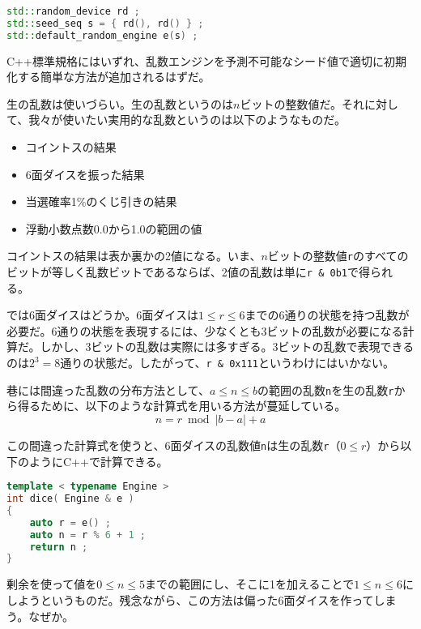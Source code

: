 \begin{lstlisting}[language={C++}]
std::random_device rd ;
std::seed_seq s = { rd(), rd() } ;
std::default_random_engine e(s) ;
\end{lstlisting}

C++標準規格にはいずれ、乱数エンジンを予測不可能なシード値で適切に初期化する簡単な方法が追加されるはずだ。

\clearpage
{}

生の乱数は使いづらい。生の乱数というのは\(n\)ビットの整数値だ。それに対して、我々が使いたい実用的な乱数というのは以下のようなものだ。

\begin{itemize}
\item
  コイントスの結果
\item
  6面ダイスを振った結果
\item
  当選確率1\%のくじ引きの結果
\item
  浮動小数点数0.0から1.0の範囲の値
\end{itemize}

コイントスの結果は表か裏かの2値になる。いま、\(n\)ビットの整数値\texttt{r}のすべてのビットが等しく乱数ビットであるならば、2値の乱数は単に\texttt{r \& 0b1}で得られる。

では6面ダイスはどうか。6面ダイスは\(1 \leq r \leq 6\)までの6通りの状態を持つ乱数が必要だ。6通りの状態を表現するには、少なくとも3ビットの乱数が必要になる計算だ。しかし、3ビットの乱数は実際には多すぎる。3ビットの乱数で表現できるのは\(2^3=8\)通りの状態だ。したがって、\texttt{r \& 0x111}というわけにはいかない。

巷には間違った乱数の分布方法として、\(a \leq n \leq b\)の範囲の乱数\texttt{n}を生の乱数\texttt{r}から得るために、以下のような計算式を用いる方法が蔓延している。
\[
n = r \bmod |b-a| + a
\]

この間違った計算式を使うと、6面ダイスの乱数値\texttt{n}は生の乱数\texttt{r}（\(0 \leq r\)）から以下のようにC++で計算できる。

\begin{lstlisting}[language={C++}]
template < typename Engine >
int dice( Engine & e )
{
    auto r = e() ;
    auto n = r % 6 + 1 ;
    return n ;
}
\end{lstlisting}

剰余を使って値を\(0 \leq n \leq 5\)までの範囲にし、そこに1を加えることで\(1 \leq n \leq 6\)にしようというものだ。残念ながら、この方法は偏った6面ダイスを作ってしまう。なぜか。

